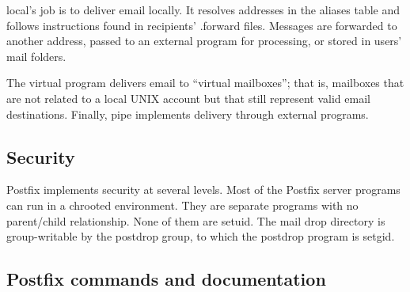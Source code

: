 \protect\hypertarget{part0026_split_058.htmlux5cux23_idIndexMarker2695}{}{}{local}'s
job is to deliver email locally. It resolves addresses in the
\protect\hypertarget{part0026_split_058.htmlux5cux23_idIndexMarker2696}{}{}{aliases}
table and follows instructions found in recipients' {.forward} files.
Messages are forwarded to another address, passed to an external program
for processing, or stored in users' mail folders.

The {virtual} program delivers email to ``virtual mailboxes''; that is,
mailboxes that are not related to a local UNIX account but that still
represent valid email destinations. Finally, {pipe} implements delivery
through external programs.

\protect\hypertarget{part0026_split_059.html}{}{}

\hypertarget{part0026_split_059.htmlux5cux23_idContainer1247}{}
\hypertarget{part0026_split_059.htmlux5cux23calibre_pb_58}{%
\subsection[Security]{\texorpdfstring{Securi\protect\hypertarget{part0026_split_059.htmlux5cux23_idTextAnchor1170}{}{}ty}{Security}}\label{part0026_split_059.htmlux5cux23calibre_pb_58}}

\protect\hypertarget{part0026_split_059.htmlux5cux23_idIndexMarker2697}{}{}\protect\hypertarget{part0026_split_059.htmlux5cux23_idIndexMarker2698}{}{}Postfix
implements security at several levels. Most of the Postfix server
programs can run in a {chroot}ed environment. They are separate programs
with no {parent/child} relationship. None of them are setuid. The mail
drop directory is group-writable by the postdrop group, to which the
{postdrop}
\protect\hypertarget{part0026_split_059.htmlux5cux23_idIndexMarker2699}{}{}program
is setgid.

\protect\hypertarget{part0026_split_060.html}{}{}

\hypertarget{part0026_split_060.htmlux5cux23_idContainer1247}{}
\hypertarget{part0026_split_060.htmlux5cux23calibre_pb_59}{%
\subsection[Postfix commands and
documentation]{\texorpdfstring{\protect\hypertarget{part0026_split_060.htmlux5cux23_idTextAnchor1171}{}{}Postfix
commands and
documentation}{Postfix commands and documentation}}\label{part0026_split_060.htmlux5cux23calibre_pb_59}}

